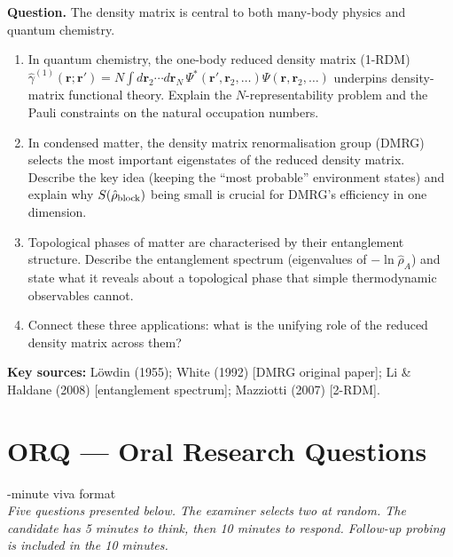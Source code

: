 \documentclass[11pt,a4paper]{article}
\begin{document}
\begin{tcolorbox}[researchbox, title={WRQ 5 --- Applications: Density Matrices in Condensed Matter and Quantum Chemistry}]

\textbf{Question.}
The density matrix is central to both many-body physics and quantum chemistry.

\begin{enumerate}[leftmargin=1.8em, label=(\alph*), itemsep=6pt]
  \item In quantum chemistry, the one-body reduced density matrix (1-RDM)
        $\hat{\gamma}^{(1)}(\mathbf{r};\mathbf{r}')=N\int d\mathbf{r}_2\cdots d\mathbf{r}_N\,
        \Psi^*(\mathbf{r}',\mathbf{r}_2,\ldots)\Psi(\mathbf{r},\mathbf{r}_2,\ldots)$
        underpins density-matrix functional theory.
        Explain the $N$-representability problem and the Pauli constraints on the
        natural occupation numbers.
  \item In condensed matter, the density matrix renormalisation group (DMRG)
        selects the most important eigenstates of the reduced density matrix.
        Describe the key idea (keeping the ``most probable'' environment states)
        and explain why $S(\hat{\rho}_{\rm block})$ being small is crucial for DMRG's
        efficiency in one dimension.
  \item Topological phases of matter are characterised by their entanglement structure.
        Describe the entanglement spectrum (eigenvalues of $-\ln\hat{\rho}_A$)
        and state what it reveals about a topological phase that simple
        thermodynamic observables cannot.
  \item Connect these three applications: what is the unifying role of the
        reduced density matrix across them?
\end{enumerate}

\medskip\textbf{Key sources:} Löwdin (1955); White (1992) [DMRG original paper];
Li \& Haldane (2008) [entanglement spectrum]; Mazziotti (2007) [2-RDM].
\end{tcolorbox}

\newpage
\section*{ORQ --- Oral Research Questions}
\begin{center}
  -minute viva format\\[6pt]
  \textit{Five questions presented below. The examiner selects two at random.
  The candidate has 5 minutes to think, then 10 minutes to respond.
  Follow-up probing is included in the 10 minutes.}
\end{center}
\end{document}
